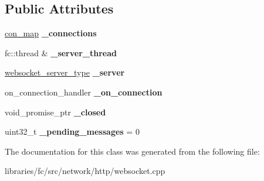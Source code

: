 \subsection*{Public Attributes}
\begin{DoxyCompactItemize}
\item 
\mbox{\label{classfc_1_1http_1_1detail_1_1websocket__server__impl_a6c7b347434f594331e4c8a6db85617d2}} 
\mbox{\hyperlink{classstd_1_1map}{con\+\_\+map}} {\bfseries \+\_\+connections}
\item 
\mbox{\label{classfc_1_1http_1_1detail_1_1websocket__server__impl_ae916e16d5d40e8d8e06ac9bdfb691497}} 
fc\+::thread \& {\bfseries \+\_\+server\+\_\+thread}
\item 
\mbox{\label{classfc_1_1http_1_1detail_1_1websocket__server__impl_af796bd2ffbc2adee35f8f56209a0295c}} 
\mbox{\hyperlink{classwebsocketpp_1_1server}{websocket\+\_\+server\+\_\+type}} {\bfseries \+\_\+server}
\item 
\mbox{\label{classfc_1_1http_1_1detail_1_1websocket__server__impl_a27a2a20f48262ef6c7541f4f03c7c455}} 
on\+\_\+connection\+\_\+handler {\bfseries \+\_\+on\+\_\+connection}
\item 
\mbox{\label{classfc_1_1http_1_1detail_1_1websocket__server__impl_a629fe4199fb52aca26d69acbdd778396}} 
void\+\_\+promise\+\_\+ptr {\bfseries \+\_\+closed}
\item 
\mbox{\label{classfc_1_1http_1_1detail_1_1websocket__server__impl_ad73225fae351c5103d70f64fb2e84b07}} 
uint32\+\_\+t {\bfseries \+\_\+pending\+\_\+messages} = 0
\end{DoxyCompactItemize}


The documentation for this class was generated from the following file\+:\begin{DoxyCompactItemize}
\item 
libraries/fc/src/network/http/websocket.\+cpp\end{DoxyCompactItemize}
